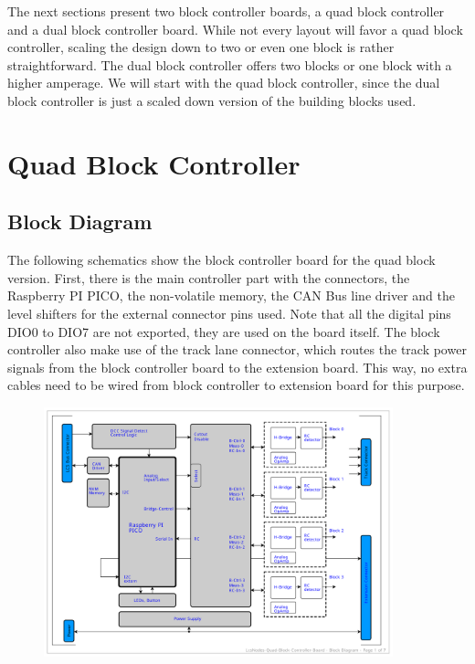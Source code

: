 The next sections present two block controller boards, a quad block controller and a dual block controller board. While not every layout will favor a quad block controller, scaling the design down to two or even one block is rather straightforward. The dual block controller offers two blocks or one block with a higher amperage. We will start with the quad block controller, since the dual block controller is just a scaled down version of the building blocks used.

\section{Quad Block Controller}

\subsection{Block Diagram}

The following schematics show the block controller board for the quad block version. First, there is the main controller part with the connectors, the Raspberry PI PICO, the non-volatile memory, the CAN Bus line driver and the level shifters for the external connector pins used. Note that all the digital pins DIO0 to DIO7 are not exported, they are used on the board itself. The block controller also make use of the track lane connector, which routes the track power signals from the block controller board to the extension board. This way, no extra cables need to be wired from block controller to extension board for this purpose. 

\begin{figure}[htbp]
    \centering
    \includegraphics[page=1, width=0.9\textwidth]{./Schematics/Schematic_LcsNodes-Quad-Block-Controller.pdf}
\end{figure}
\FloatBarrier

